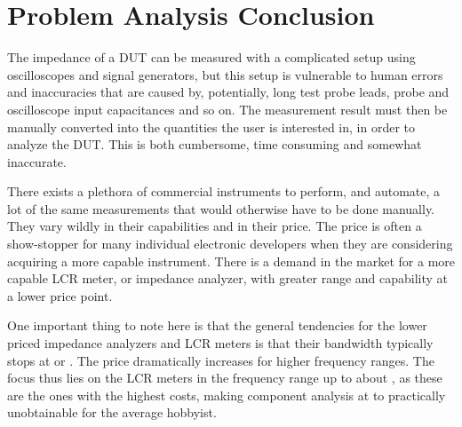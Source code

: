 \section{Problem Analysis Conclusion} \label{sec:probAnalConc}
The impedance of a DUT can be measured with a complicated setup using oscilloscopes and signal generators, but this setup is vulnerable to human errors and inaccuracies that are caused by, potentially, long test probe leads, probe and oscilloscope input capacitances and so on. The measurement result must then be manually converted into the quantities the user is interested in, in order to analyze the DUT. This is both cumbersome, time consuming and somewhat inaccurate.

There exists a plethora of commercial instruments to perform, and automate, a lot of the same measurements that would otherwise have to be done manually. They vary wildly in their capabilities and in their price. The price is often a show-stopper for many individual electronic developers when they are considering acquiring a more capable instrument. There is a demand in the market for a more capable LCR meter, or impedance analyzer, with greater range and capability at a lower price point.

One important thing to note here is that the general tendencies for the lower priced impedance analyzers and LCR meters is that their bandwidth typically stops at  or . The price dramatically increases for higher frequency ranges. The focus thus lies on the LCR meters in the frequency range up to about , as these are the ones with the highest costs, making component analysis at  to  practically unobtainable for the average hobbyist.